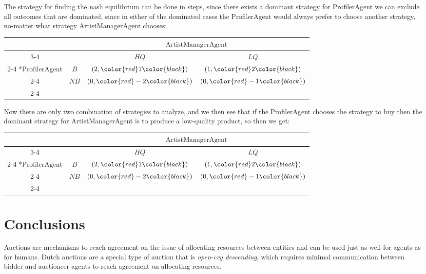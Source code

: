 \documentclass[a4paper, 11pt]{article}
\begin{document}
The strategy for finding the nash equilibrium can be done in steps, since there exists a dominant strategy for ProfilerAgent we can exclude all outcomes that are dominated, since in either of the dominated cases the ProfilerAgent would always prefer to choose another strategy, no-matter what strategy ArtistManagerAgent chooses: 

 \begin{table}[H]
    \setlength{\extrarowheight}{2pt}
    \begin{tabular}{*{4}{c|}}
      \multicolumn{2}{c}{} & \multicolumn{2}{c}{\color{red}$\text{ArtistManagerAgent}$}\\\cline{3-4}
      \multicolumn{1}{c}{} &  & $HQ$  & $LQ$ \\\cline{2-4}
      \multirow{2}*{$\text{ProfilerAgent}$}  & $B$ & $(2,\color{red}1\color{black})$ & $(1,\color{red}2\color{black})$ \\\cline{2-4}
      & $NB$ & \st{$(0,\color{red}-2\color{black})$} & \st{$(0,\color{red}-1\color{black})$} \\\cline{2-4}
    \end{tabular}
  \end{table}
Now there are only two combination of strategies to analyze, and we then see that if the ProfilerAgent chooses the strategy to buy then the dominant strategy for ArtistManagerAgent is to produce a low-quality product, so then we get:
 \begin{table}[H]
    \setlength{\extrarowheight}{2pt}
    \begin{tabular}{*{4}{c|}}
      \multicolumn{2}{c}{} & \multicolumn{2}{c}{\color{red}$\text{ArtistManagerAgent}$}\\\cline{3-4}
      \multicolumn{1}{c}{} &  & $HQ$  & $LQ$ \\\cline{2-4}
      \multirow{2}*{$\text{ProfilerAgent}$}  & $B$ & \st{$(2,\color{red}1\color{black})$} & $(1,\color{red}2\color{black})$ \\\cline{2-4}
      & $NB$ & \st{$(0,\color{red}-2\color{black})$} & \st{$(0,\color{red}-1\color{black})$} \\\cline{2-4}
    \end{tabular}
  \end{table}
\section*{Conclusions}
Auctions are mechanisms to reach agreement on the issue of allocating resources between entities and can be used just as well for agents as for humans. Dutch auctions are a special type of auction that is \textit{open-cry descending}, which requires minimal communication between bidder and auctioneer agents to reach agreement on allocating resources.
\end{document}
